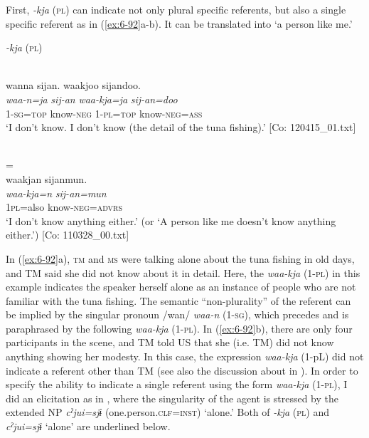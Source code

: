 First, \textit{-kja} (\textsc{pl}) can indicate not only plural specific referents, but also a single specific referent as in (\ref{ex:6-92}a-b). It can be translated into ‘a person like me.’

\ea\label{ex:6-92}
  \textit{-kja} (\textsc{pl})

 \ea{}\\
{\TM}
\glll  wanna  sijan.  waakjoo  sijandoo.\\
\textit{waa-n=ja}  \textit{sij-an}  \textit{waa-kja=ja}  \textit{sij-an=doo}\\
1-\textsc{sg}=\textsc{top}  know-\textsc{neg}  1-\textsc{pl}=\textsc{top}  know-\textsc{neg}=\textsc{ass}\\
\glt ‘I don’t know. I don’t know (the detail of the tuna fishing).’ [Co: 120415\_01.txt]
\z

\ex{}\\
= \\

{\TM}
\glll waakjan  sijanmun.\\
      \textit{waa-kja=n}  \textit{sij-an=mun}\\
      1\textsc{pl}=also  know-\textsc{neg}=\textsc{advrs}\\
\glt ‘I don’t know anything either.’ (or ‘A person like me doesn’t know anything either.’)      [Co: 110328\_00.txt]
\z

In (\ref{ex:6-92}a), \textsc{tm} and \textsc{ms} were talking alone about the tuna fishing in old days, and TM said she did not know about it in detail. Here, the \textit{waa-kja} (1-\textsc{pl}) in this example indicates the speaker herself alone as an instance of people who are not familiar with the tuna fishing. The semantic “non-plurality” of the referent can be implied by the singular pronoun /wan/ \textit{waa-n} (1-\textsc{sg}), which precedes and is paraphrased by the following \textit{waa-kja} (1-\textsc{pl}). In (\ref{ex:6-92}b), there are only four participants in the scene, and TM told US that she (i.e. TM) did not know anything showing her modesty. In this case, the expression \textit{waa-kja} (1-pL) did not indicate a referent other than TM (see also the discussion about  in ). In order to specify the ability to indicate a single referent using the form \textit{waa-kja} (1-\textsc{pl}), I did an elicitation as in , where the singularity of the agent is stressed by the extended NP \textit{cˀjui=sjɨ} (one.person.\textsc{clf}=\textsc{inst}) ‘alone.’ Both of \textit{-kja} (\textsc{pl}) and \textit{cˀjui=sjɨ} ‘alone’ are underlined below.

